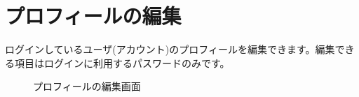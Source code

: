 \documentclass[11ptm]{jsarticle}
\begin{document}
\section{プロフィールの編集}
\label{sec:プロフィールの編集}
ログインしているユーザ(アカウント)のプロフィールを編集できます。編集できる項目はログインに利用するパスワードのみです。
\begin{figure}[h]
  \centering
  \caption{\label{fig:プロフィールの編集画面}プロフィールの編集画面}
\end{figure}


\clearpage
\end{document}
